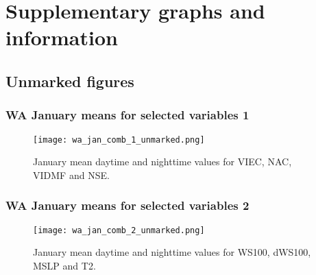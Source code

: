 \chapter{Supplementary graphs and information}
\label{app:supp}

\section{Unmarked figures}
\label{sec:unmarked}

\subsection{WA January means for selected variables 1}

\begin{figure}[!ht]
	\centering
	\texttt{[image: wa\_jan\_comb\_1\_unmarked.png]}
	\caption[WA January means for selected variables 1 (unmarked)]{January mean daytime and nighttime values for \acs{VIEC}, \acs{NAC}, \acs{VIDMF} and \acs{NSE}.}
	\label{fig:wa_jan_comb_1_unmarked}
\end{figure}

\subsection{WA January means for selected variables 2}

\begin{figure}[!ht]
	\centering
	\texttt{[image: wa\_jan\_comb\_2\_unmarked.png]}
	\caption[WA January means for selected variables 2 (unmarked)]{January mean daytime and nighttime values for \acs{WS100}, \acs{dWS100}, \acs{MSLP} and \acs{T2}.}
	\label{fig:wa_jan_comb_2_unmarked}
\end{figure}
